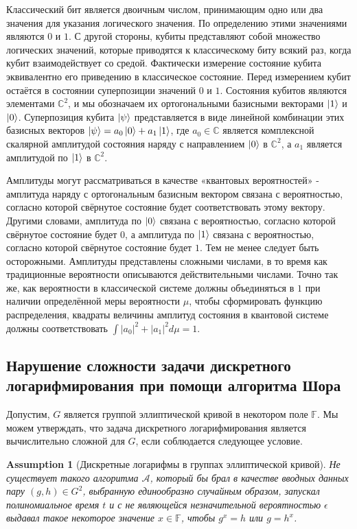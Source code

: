 \documentclass{mrl}
\newtheorem{ass}[thm]{Assumption}
\begin{document}
Классический бит является двоичным числом, принимающим одно или два значения для указания логического значения. По определению этими значениями являются $0$ и $1$. С другой стороны, кубиты представляют собой множество логических значений, которые приводятся к классическому биту всякий раз, когда кубит взаимодействует со средой. Фактически измерение состояние кубита эквивалентно его приведению в классическое состояние. Перед измерением кубит остаётся в состоянии суперпозиции значений $0$ и $1$. Состояния кубитов являются элементами $\mathbb{C}^2$, и мы обозначаем их ортогональными базисными векторами $\ket{1}$ и $\ket{0}$. Суперпозиция кубита $\ket{\psi}$ представляется в виде линейной комбинации этих базисных векторов $\ket{\psi} = a_0\ket{0} + a_1 \ket{1}$, где $a_0 \in \mathbb{C}$ является комплексной скалярной амплитудой состояния наряду с направлением $\ket{0}$ в $\mathbb{C}^2$, а $a_1$ является амплитудой по $\ket{1}$ в $\mathbb{C}^2$. 

Амплитуды могут рассматриваться в качестве «квантовых вероятностей» - амплитуда наряду с ортогональным базисным вектором связана с вероятностью, согласно которой свёрнутое состояние будет соответствовать этому вектору. Другими словами, амплитуда по $\ket{0}$ связана с вероятностью, согласно которой свёрнутое состояние будет $0$, а амплитуда по $\ket{1}$ связана с вероятностью, согласно которой свёрнутое состояние будет $1$. Тем не менее следует быть осторожными. Амплитуды представлены сложными числами, в то время как традиционные вероятности описываются действительными числами. Точно так же, как вероятности в классической системе должны объединяться в $1$ при наличии определённой меры вероятности $\mu$, чтобы сформировать функцию распределения, квадраты величины амплитуд состояния в квантовой системе должны соответствовать $\int \left|a_0\right|^2 + \left|a_1\right|^2 d\mu= 1$.

\subsection{Нарушение сложности задачи дискретного логарифмирования при помощи алгоритма Шора}\label{subsec:Shorsalgo}

Допустим, $G$ является группой эллиптической кривой в некотором поле $\mathbb{F}$. Мы можем утверждать, что задача дискретного логарифмирования является вычислительно сложной для $G$, если соблюдается следующее условие.

\begin{ass}[Дискретные логарифмы в группах эллиптической кривой]\label{ass:hsp}
Не существует такого алгоритма $\mathcal{A}$, который бы брал в качестве вводных данных пару $(g, h) \in G^2$, выбранную единообразно случайным образом, запускал полиномиальное время $t$ и с не являющейся незначительной вероятностью $\epsilon$ выдавал такое некоторое значение $x \in \mathbb{F}$, чтобы $g^x = h$ или $g = h^x$.
\end{ass}
\end{document}
